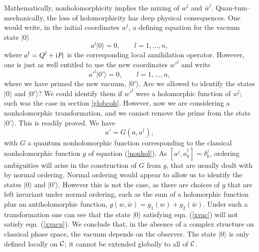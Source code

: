 \documentclass[a4paper,a4paper]{article}
\begin{document}
Mathematically, nonholomorphicity implies the mixing of $w^l$ and $\bar w^l$.
Quan-tum--mechanically, the loss of holomorphicity has deep physical consequences.
One would write, in the initial coordinates $w^l$, a defining equation for the vacuum 
state $|0\rangle$
\begin{equation}
a^l|0\rangle =0, \qquad l=1,\ldots, n,
\label{xvac}
\end{equation}
where $a^l=Q^l + {\rm i} P_l$ is the corresponding local annihilation operator.
However, one is just as well entitled to use the new coordinates $w'^l$
and write
\begin{equation}
a'^l|0'\rangle =0, \qquad l=1,\ldots, n,
\label{xvacu}
\end{equation}
where we have primed the new vacuum, $|0'\rangle$. 
Are we allowed to identify the states $|0\rangle$ and $|0'\rangle$? 
We could identify them if $w'^l$ were a holomorphic function of $w^l$; 
such was the case in section \ref{globcoh}. However, now we are considering 
a nonholomorphic transformation, and we cannot remove the 
prime from the state $|0'\rangle$. This is readily proved.
We have
\begin{equation}
a'=G(a, a^{\dagger}),
\label{effe}
\end{equation}
with $G$ a quantum nonholomorphic function corresponding to the classical 
nonholomorphic function $g$ of equation (\ref{nonhol}). As $[a^j,a_k^{\dagger}]=\delta^j_k$, 
ordering ambiguities will arise in the construction of $G$ from $g$,
that are usually dealt with by normal ordering. Normal ordering would 
appear to allow us to identify the states $|0\rangle$ and $|0'\rangle$.
However this is not the case, as there are choices of $g$ that are left invariant under 
normal ordering, such as the sum of a holomorphic function plus
an antiholomorphic function, $g(w,\bar w) = g_1(w) + g_2(\bar w)$.
Under such a transformation one can see that the state $|0\rangle$ satisfying 
eqn. (\ref{xvac}) will not satisfy eqn. (\ref{xvacu}). 
We conclude that, in the absence of a complex structure 
on classical phase space, the vacuum depends on the observer. 
The state $|0\rangle$ is only defined locally on ${\cal C}$; it cannot be 
extended globally to all of ${\cal C}$. 
\end{document}
